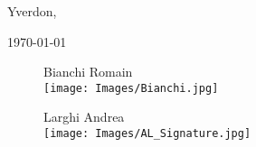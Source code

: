 \documentclass{rapport}
\begin{document}







\fairepagedegarde %
\thispagestyle{noPage}
\tabledematieres %
\thispagestyle{noPage}
\newpage
\listoffigures
\listoftables
\clearpage
\setcounter{page}{1}
\fairemarges %






%





\begin{flushright}
    Yverdon, {\today\par}
\end{flushright}

\begin{figure}[H]
    \centering
    \begin{minipage}[b]{0.3\textwidth}
      \centering
      Bianchi Romain\\
      \texttt{[image: Images/Bianchi.jpg]}
    \end{minipage}
    \hfill
    \begin{minipage}[b]{0.3\textwidth}
      \centering
      Larghi Andrea\\
      \texttt{[image: Images/AL\_Signature.jpg]}
    \end{minipage}
  \end{figure}

\newpage
\printbibliography %


\newpage
\appendix

% 

\end{document}
